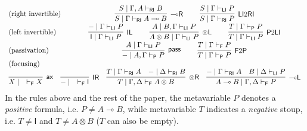 \documentclass[submission,copyright,creativecommons]{eptcs}
\theoremstyle{definition}
\newcommand{\tl}{\otimes \mathsf{L}}
\newcommand{\tr}{\otimes \mathsf{R}}
\newcommand{\lright}{{\multimap}\mathsf{R}}
\newcommand{\lleft}{{\multimap}\mathsf{L}}
\newcommand{\pass}{\mathsf{pass}}
\newcommand{\unitl}{\mathsf{IL}}
\newcommand{\unitr}{\mathsf{IR}}
\newcommand{\ax}{\mathsf{ax}}
\newcommand{\ot}{\otimes}
\newcommand{\lolli}{\multimap}
\newcommand{\I}{\mathsf{I}}
\newcommand{\RI}{\mathsf{RI}}
\newcommand{\LI}{\mathsf{LI}}
\newcommand{\Pass}{\mathsf{P}}
\newcommand{\F}{\mathsf{F}}
\newcommand{\proofbox}[1]{\begin{tabular}{l} #1 \end{tabular}}
\begin{document}
\begin{equation}\label{eq:naive}
  \begin{array}{lc}
    \text{(right invertible)} & %
    \proofbox{
    \infer[\lright]{S \mid \Gamma \vdash_{\RI} A \lolli B}{S \mid \Gamma , A \vdash_{\RI} B}
    \qquad
    \infer[\LI 2 \RI]{S \mid \Gamma \vdash_{\RI} P}{S \mid \Gamma \vdash_{\LI} P}
    }
    \\[6pt]
    \text{(left invertible)} & %
    \proofbox{
    \infer[\unitl]{\I \mid \Gamma \vdash_{\LI} P}{- \mid \Gamma \vdash_{\LI} P}
    \qquad
    \infer[\tl]{A \ot B \mid \Gamma \vdash_{\LI} P}{A \mid B , \Gamma \vdash_{\LI} P}
    \qquad
    \infer[\Pass 2 \LI]{T \mid \Gamma \vdash_{\LI} P}{T \mid \Gamma \vdash_{\Pass} P}
    }
    \\[6pt]
    \text{(passivation)} & %
    \proofbox{
      \infer[\pass]{- \mid A , \Gamma \vdash_{\Pass} P }{
      A\mid \Gamma \vdash_{\LI} P
    }
    \qquad
    \infer[\F 2 \Pass]{T \mid \Gamma \vdash_{\Pass} P}{
      T \mid \Gamma \vdash_{\F} P
    }
    }
    \\
    \text{(focusing)} &    \\ %
    \multicolumn{2}{c}{
    \infer[\ax]{X \mid \quad \vdash_{\F} X}{}
    \quad
    \infer[\unitr]{- \mid \quad \vdash_{\F} \I}{}
    \quad
    \infer[\tr]{T \mid \Gamma , \Delta \vdash_{\F} A \ot B}{
      T \mid \Gamma \vdash_{\RI} A
      &
      - \mid \Delta \vdash_{\RI} B
    }
    \quad
    \infer[\lleft]{A \lolli B \mid \Gamma , \Delta \vdash_{\F} P}{
      - \mid \Gamma \vdash_{\RI} A
      &
      B \mid \Delta \vdash_{\LI} P
    }
    }
  \end{array}
\end{equation}
In the rules above and the rest of the paper, the metavariable $P$ denotes a \emph{positive} formula, i.e. $P \not= A \lolli B$, while metavariable $T$ indicates a \emph{negative} stoup, i.e. $T \not= \I$ and $T\not= A \ot B$ ($T$ can also be empty).
\end{document}
